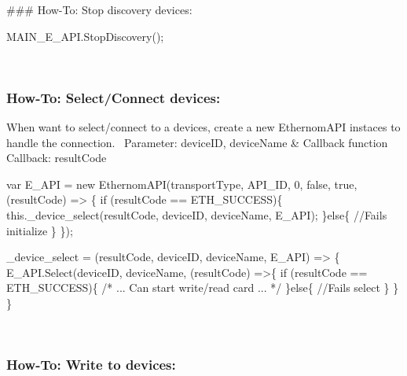 \#\#\# How-\/\+To\+: Stop discovery devices\+: 
\begin{DoxyCode}
MAIN\_E\_API.StopDiscovery();
\end{DoxyCode}
 ~\newline


\subsubsection*{How-\/\+To\+: Select/\+Connect devices\+:}

When want to select/connect to a devices, create a new Ethernom\+A\+PI instaces to handle the connection.~\newline
 Parameter\+: device\+ID, device\+Name \& Callback function~\newline
 Callback\+: result\+Code 
\begin{DoxyCode}
var E\_API = new EthernomAPI(transportType, API\_ID, 0, false, true, (resultCode) => \{
    if (resultCode == ETH\_SUCCESS)\{
        this.\_device\_select(resultCode, deviceID, deviceName, E\_API);
    \}else\{
        //Fails initialize
    \}
\});

\_device\_select = (resultCode, deviceID, deviceName, E\_API) => \{
    E\_API.Select(deviceID, deviceName, (resultCode) =>\{
        if (resultCode == ETH\_SUCCESS)\{
            /*
            ...
            Can start write/read card
            ...
            */
        \}else\{
            //Fails select
        \}
    \}
\}
\end{DoxyCode}
 ~\newline


\subsubsection*{How-\/\+To\+: Write to devices\+:}

